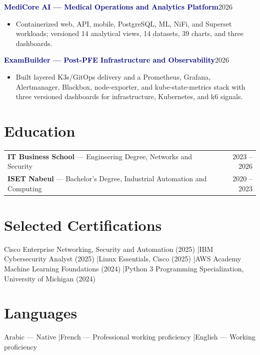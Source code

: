 \documentclass[9pt,a4paper]{extarticle}
\newcommand{\project}[2]{\textbf{\textcolor{navy}{#1}}\hfill\textcolor{muted}{#2}}
\begin{document}
\project{MediCore AI --- Medical Operations and Analytics Platform}{2026}
\begin{itemize}
  \item Containerized web, API, mobile, PostgreSQL, ML, NiFi, and Superset workloads; versioned 14 analytical views, 14 datasets, 39 charts, and three dashboards.
\end{itemize}

\project{ExamBuilder --- Post-PFE Infrastructure and Observability}{2026}
\begin{itemize}
  \item Built layered K3s/GitOps delivery and a Prometheus, Grafana, Alertmanager, Blackbox, node-exporter, and kube-state-metrics stack with three versioned dashboards for infrastructure, Kubernetes, and k6 signals.
\end{itemize}

\section*{Education}
\begin{tabularx}{\linewidth}{@{}Xr@{}}
\textbf{IT Business School} --- Engineering Degree, Networks and Security & \textcolor{muted}{2023 -- 2026} \\
\textbf{ISET Nabeul} --- Bachelor's Degree, Industrial Automation and Computing & \textcolor{muted}{2020 -- 2023} \\
\end{tabularx}

\section*{Selected Certifications}
Cisco Enterprise Networking, Security and Automation (2025) \enspace|\enspace IBM Cybersecurity Analyst (2025) \enspace|\enspace Linux Essentials, Cisco (2025) \enspace|\enspace AWS Academy Machine Learning Foundations (2024) \enspace|\enspace Python 3 Programming Specialization, University of Michigan (2024)

\section*{Languages}
Arabic --- Native \enspace|\enspace French --- Professional working proficiency \enspace|\enspace English --- Working proficiency
\end{document}
